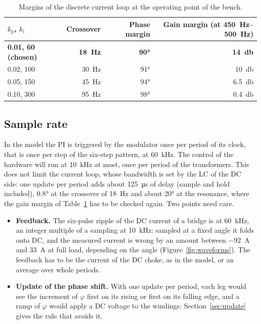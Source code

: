 \documentclass[12pt,a4paper]{scrartcl}
\newcommand{\ped}[1]{_{\mathrm{#1}}}
\begin{document}
\begin{onehalfspace}
\begin{table}[H]
	\centering
	\captionsetup{width=0.9\textwidth, font=small}
	\caption{Margins of the discrete current loop at the operating point of the bench.}
	\label{tab:margins}
	\small
	\begin{tabular}{@{} l r r r @{}}
		\toprule
		$k\ped{p}$, $k\ped{i}$ & Crossover & Phase margin & Gain margin (at \SIrange{450}{500}{\hertz}) \\
		\midrule
		\textbf{0.01, 60 (chosen)} & \textbf{\SI{18}{\hertz}} & \textbf{\ang{90}} & \textbf{\SI{14}{\decibel}} \\
		0.02, 100 & \SI{30}{\hertz} & \ang{91} & \SI{10}{\decibel} \\
		0.05, 150 & \SI{45}{\hertz} & \ang{94} & \SI{6.5}{\decibel} \\
		0.10, 300 & \SI{95}{\hertz} & \ang{98} & \SI{0.4}{\decibel} \\
		\bottomrule
	\end{tabular}
\end{table}

\subsection{Sample rate}
\label{sec:sampling}

In the model the PI is triggered by the modulator once per period of its clock, that is once per step of the six-step pattern, at \SI{60}{\kilo\hertz}. The control of the hardware will run at \SI{10}{\kilo\hertz} at most, once per period of the transformers. This does not limit the current loop, whose bandwidth is set by the LC of the DC side: one update per period adds about \SI{125}{\micro\second} of delay (sample and hold included), \ang{0.8} at the crossover of \SI{18}{\hertz} and about \ang{20} at the resonance, where the gain margin of Table~\ref{tab:margins} has to be checked again. Two points need care.
\begin{itemize}[nosep]
	\item \textbf{Feedback.} The six-pulse ripple of the DC current of a bridge is at \SI{60}{\kilo\hertz}, an integer multiple of a sampling at \SI{10}{\kilo\hertz}: sampled at a fixed angle it folds onto DC, and the measured current is wrong by an amount between \SI{-92}{\ampere} and \SI{+33}{\ampere} at full load, depending on the angle (Figure~\ref{fig:waveforms}). The feedback has to be the current of the DC choke, as in the model, or an average over whole periods.
	\item \textbf{Update of the phase shift.} With one update per period, each leg would see the increment of $\varphi$ first on its rising or first on its falling edge, and a ramp of $\varphi$ would apply a DC voltage to the windings: Section~\ref{sec:update} gives the rule that avoids it.
\end{itemize}


\end{onehalfspace}
\end{document}
